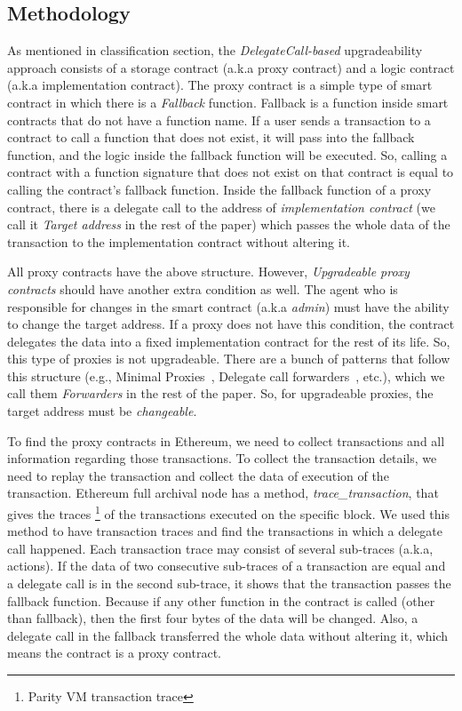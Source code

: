 \subsection{Methodology}
As mentioned in classification section, the \textit{DelegateCall-based} upgradeability approach consists of a storage contract (a.k.a proxy contract) and a logic contract (a.k.a implementation contract). 
The proxy contract is a simple type of smart contract in which there is a \textit{Fallback} function. Fallback is a function inside smart contracts that do not have a function name. If a user sends a transaction to a contract to call a function that does not exist, it will pass into the fallback function, and the logic inside the fallback function will be executed. So, calling a contract with a function signature that does not exist on that contract is equal to calling the contract's fallback function. Inside the fallback function of a proxy contract, there is a delegate call to the address of \textit{implementation contract} (we call it \emph{Target address} in the rest of the paper) which passes the whole data of the transaction to the implementation contract without altering it.

All proxy contracts have the above structure. However, \textit{Upgradeable proxy contracts} should have another extra condition as well. The agent who is responsible for changes in the smart contract (a.k.a \emph{admin}) must have the ability to change the target address. If a proxy does not have this condition, the contract delegates the data into a fixed implementation contract for the rest of its life. So, this type of proxies is not upgradeable. There are a bunch of patterns that follow this structure (e.g., Minimal Proxies~\cite{minimalProxy}, Delegate call forwarders~\cite{delegatecallForwarders}, etc.), which we call them \textit{Forwarders} in the rest of the paper. So, for upgradeable proxies, the target address must be \emph{changeable}.

To find the proxy contracts in Ethereum, we need to collect transactions and all information regarding those transactions. To collect the transaction details, we need to replay the transaction and collect the data of execution of the transaction. Ethereum full archival node has a method, \textit{trace\_transaction}, that gives the traces \footnote{Parity VM transaction trace} of the transactions executed on the specific block. We used this method to have transaction traces and find the transactions in which a delegate call happened. Each transaction trace may consist of several sub-traces (a.k.a, actions).
If the data of two consecutive sub-traces of a transaction are equal and a delegate call is in the second sub-trace, it shows that the transaction passes the fallback function. Because if any other function in the contract is called (other than fallback), then the first four bytes of the data will be changed. Also, a delegate call in the fallback transferred the whole data without altering it, which means the contract is a proxy contract.

